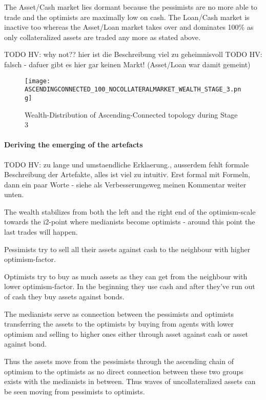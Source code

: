 \documentclass[Bachelorarbeit.tex]{subfiles}
\begin{document}
\medskip

The Asset/Cash market lies dormant because the pessimists are no more able to trade and the optimists are maximally low on cash. The Loan/Cash market is inactive too whereas the Asset/Loan market takes over and dominates 100\% as only collateralized assets are traded any more as stated above.

TODO HV: why not?? hier ist die Beschreibung viel zu geheimnisvoll
TODO HV: falsch - dafuer gibt es hier gar keinen Markt! (Asset/Loan war damit gemeint)

\begin{figure}[H]
	\centering
  \texttt{[image: ASCENDINGCONNECTED\_100\_NOCOLLATERALMARKET\_WEALTH\_STAGE\_3.png]}
  	\caption{Wealth-Distribution of Ascending-Connected topology during Stage 3}
	\label{fig:markets_ASCENDINGCONNECTED_100_NOCOLLATERALMARKET_WEALTH_STAGE_3}
\end{figure}

\paragraph{Deriving the emerging of the artefacts}
TODO HV: zu lange und umstaendliche Erklaerung., ausserdem fehlt formale Beschreibung der Artefakte, alles ist viel zu intuitiv. Erst formal mit Formeln, dann ein paar Worte - siehe als Verbesserungsweg meinen Kommentar weiter unten.


The wealth stabilizes from both the left and the right end of the optimism-scale towards the i2-point where medianists become optimists - around this point the last trades will happen.

\medskip 

Pessimists try to sell all their assets against cash to the neighbour with higher optimism-factor.

\medskip 

Optimists try to buy as much assets as they can get from the neighbour with lower optimism-factor. In the beginning they use cash and after they've run out of cash they buy assets against bonds.

\medskip 

The medianists serve as connection between the pessimists and optimists transferring the assets to the optimists by buying from agents with lower optimism and selling to higher ones either through asset against cash or asset against bond.

\medskip 

Thus the assets move from the pessimists through the ascending chain of optimism to the optimists as no direct connection between these two groups exists with the medianists in between. Thus waves of uncollateralized assets can be seen moving from pessimists to optimists.
\end{document}
